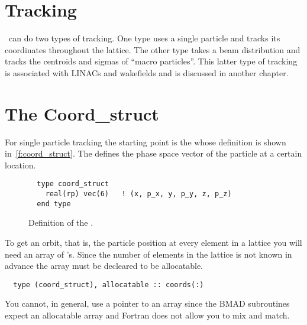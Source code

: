 \chapter{Tracking}

\bmad\ can do two types of tracking. One type uses a single particle 
and tracks its coordinates throughout the lattice. The other type
takes a beam distribution and tracks the centroids and sigmas of
``macro particles''.  This latter type of tracking is associated with
LINACs and wakefields and is discussed in another chapter.

\chapter{The Coord\_struct}

For single particle tracking the starting point is the
 whose definition is shown
in~\ref{f:coord_struct}. The  defines the phase
space vector of the particle at a certain location.

\begin{figure}[tb]
\centering
\small
\begin{verbatim}
  type coord_struct
    real(rp) vec(6)   ! (x, p_x, y, p_y, z, p_z)
  end type
\end{verbatim}
\caption{Definition of the .}
\label{f:ele_struct}
\end{figure}

To get an orbit, that is, the particle position at every element in a lattice
you will need an array of 's. Since
the number of elements in the lattice is not known in advance the
array must be decleared to be allocatable. 
\begin{verbatim}
  type (coord_struct), allocatable :: coords(:)
\end{verbatim}
You cannot, in general, use a pointer to an array since the BMAD
subroutines expect an allocatable array and Fortran does not allow you
to mix and match.

